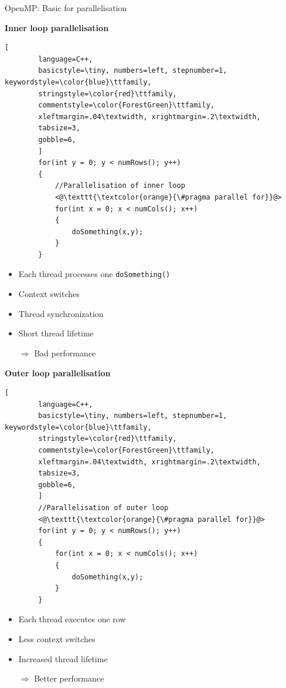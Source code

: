\documentclass[shortpres,usenames,dvipsnames]{beamer}
\begin{document}
\begin{frame}[containsverbatim]{OpenMP: Basic for parallelisation}
	\begin{multicols}{2}
		\textbf{Inner loop parallelisation}
		\begin{lstlisting}[
		language=C++,
		basicstyle=\tiny, numbers=left, stepnumber=1, keywordstyle=\color{blue}\ttfamily,
		stringstyle=\color{red}\ttfamily,
		commentstyle=\color{ForestGreen}\ttfamily,
		xleftmargin=.04\textwidth, xrightmargin=.2\textwidth,
		tabsize=3,
		gobble=6,
		]
		for(int y = 0; y < numRows(); y++)
		{
			//Parallelisation of inner loop
			<@\texttt{\textcolor{orange}{\#pragma parallel for}}@>
			for(int x = 0; x < numCols(); x++)
			{
				doSomething(x,y);
			}
		}
		\end{lstlisting}
		
		\begin{itemize}
			\item Each thread processes one \verb|doSomething()|
			\item Context switches
			\item Thread synchronization
			\item Short thread lifetime
			\item[$\Rightarrow$] Bad performance 
		\end{itemize}
		
		\columnbreak
		
		\textbf{Outer loop parallelisation}
		\begin{lstlisting}[
		language=C++,
		basicstyle=\tiny, numbers=left, stepnumber=1, keywordstyle=\color{blue}\ttfamily,
		stringstyle=\color{red}\ttfamily,
		commentstyle=\color{ForestGreen}\ttfamily,
		xleftmargin=.04\textwidth, xrightmargin=.2\textwidth,
		tabsize=3,
		gobble=6,
		]
		//Parallelisation of outer loop
		<@\texttt{\textcolor{orange}{\#pragma parallel for}}@>
		for(int y = 0; y < numRows(); y++)
		{
			for(int x = 0; x < numCols(); x++)
			{
				doSomething(x,y);
			}
		}
		\end{lstlisting}
		
		\begin{itemize}
			\item Each thread executes one row
			\item Less context switches
			\item Increased thread lifetime
			\item[$\Rightarrow$] Better performance
		\end{itemize}
	\end{multicols}
\end{frame}
\end{document}
